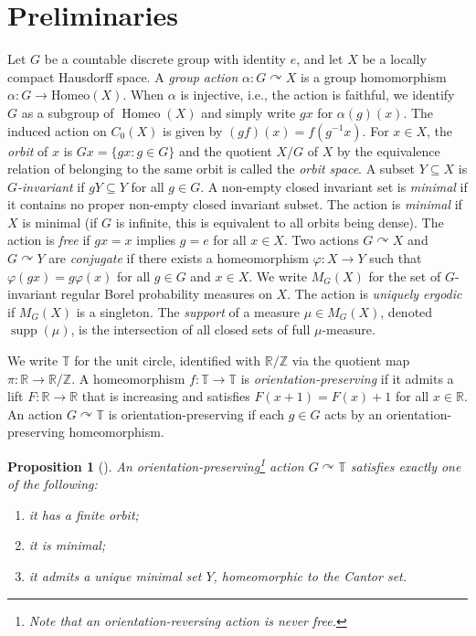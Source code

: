 \documentclass[11pt,a4paper,leqno]{amsart}
\newtheorem{prop}[thm]{Proposition}
\theoremstyle{definition}
\theoremstyle{remark}
\numberwithin{equation}{section}
\theoremstyle{plain}
\DeclareMathOperator{\supp}{supp}
\DeclareMathOperator{\homeo}{Homeo}
\newcommand{\Zb}{\mathbb{Z}}
\newcommand{\Tb}{\mathbb{T}}
\newcommand{\Rb}{\mathbb{R}}
\begin{document}
\section{Preliminaries}\label{sec:background}

Let $G$ be a countable discrete group with identity $e$, and let $X$ be a locally compact Hausdorff space. A \emph{group action} $\alpha : G \curvearrowright X$ is a group homomorphism $\alpha : G \to \mathrm{Homeo}(X)$. When $\alpha$ is injective, i.e., the action is faithful, we identify $G$ as a subgroup of $\homeo(X)$ and simply write $gx$ for $\alpha(g)(x)$. The induced action on $C_0(X)$ is given by $(gf)(x) = f(g^{-1}x)$. For $x \in X$, the \emph{orbit} of $x$ is $Gx = \{gx : g \in G\}$ and the quotient $X/G$ of $X$ by the equivalence relation of belonging to the same orbit is called the \emph{orbit space}. A subset $Y \subseteq X$ is \emph{$G$-invariant} if $gY \subseteq Y$ for all $g \in G$. A non-empty closed invariant set is \emph{minimal} if it contains no proper non-empty closed invariant subset. The action is \emph{minimal} if $X$ is minimal (if $G$ is infinite, this is equivalent to all orbits being dense). The action is \emph{free} if $gx = x$ implies $g = e$ for all $x\in X$. Two actions $G \curvearrowright X$ and $G \curvearrowright Y$ are \emph{conjugate} if there exists a homeomorphism $\varphi : X \to Y$ such that $\varphi(gx) = g\varphi(x)$ for all $g \in G$ and $x\in X$. We write $M_G(X)$ for the set of $G$-invariant regular Borel probability measures on $X$. The action is \emph{uniquely ergodic} if $M_G(X)$ is a singleton. The \emph{support} of a measure $\mu\in M_G(X)$, denoted $\supp(\mu)$, is the intersection of all closed sets of full $\mu$-measure.

We write $\Tb$ for the unit circle, identified with $\Rb/\Zb$ via the quotient map $\pi : \Rb \to \Rb/\Zb$. A homeomorphism $f : \mathbb T \to \mathbb T$ is \emph{orientation-preserving} if it admits a lift $F : \mathbb R \to \mathbb R$ that is increasing and satisfies $F(x+1) = F(x)+1$ for all $x\in \Rb$. An action $G \curvearrowright \mathbb T$ is orientation-preserving if each $g \in G$ acts by an orientation-preserving homeomorphism.

\begin{prop}[{\cite[Proposition 5.6]{Ghy01}}]\label{P-structure}
	An orientation-preserving\footnote{Note that an orientation-reversing action is never free.} action $G \curvearrowright \mathbb T$ satisfies exactly one of the following:
	\begin{enumerate}
		\item it has a finite orbit;
		\item it is minimal;
		\item it admits a unique minimal set $Y$, homeomorphic to the Cantor set.
	\end{enumerate}
\end{prop}
\end{document}
